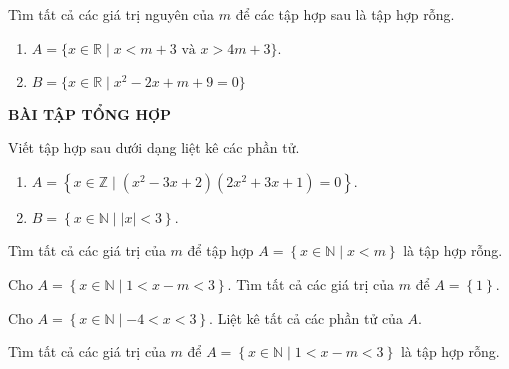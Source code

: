 \begin{bt}%
Tìm tất cả các giá trị nguyên của $m$ để các tập hợp sau là tập hợp rỗng.
\begin{enumerate}
	\item $A=\{x\in \mathbb{R} \mid x <m+3 \text{ và } x>4m+3 \}.$
	\item $B=\{x\in \mathbb{R} \mid x^2-2x+m+9=0\}$
\end{enumerate}
\end{bt}
\setcounter{bt}{0}

\begin{center}
\textbf{BÀI TẬP TỔNG HỢP}
\end{center}
\begin{bt}%
Viết tập hợp sau dưới dạng liệt kê các phần tử.
\begin{enumerate}
\item $A=\left\lbrace x\in \mathbb{Z}\mid (x^2-3x+2)(2x^2+3x+1)=0\right\rbrace$.
\item $B=\left\lbrace x\in \mathbb{N}\mid |x|<3\right\rbrace$.
\end{enumerate}
\end{bt}
\begin{bt}%
Tìm tất cả các giá trị của $m$ để tập hợp $A=\left\lbrace x\in \mathbb{N}\mid x<m\right\rbrace$ là tập hợp rỗng.
\end{bt}
\begin{bt}%
Cho $A=\left\lbrace x\in \mathbb{N}\mid 1<x-m<3 \right\rbrace$. Tìm tất cả các giá trị của $m$ để $A=\left\lbrace 1\right\rbrace$.
\end{bt}
\begin{bt}%
Cho $A=\left\lbrace x\in \mathbb{N}\mid -4<x<3\right\rbrace$. Liệt kê tất cả các phần tử của $A$.
\end{bt}
\begin{bt}%
Tìm tất cả các giá trị của $m$ để $A=\left\lbrace x\in \mathbb{N}\mid 1<x-m<3\right\rbrace$ là tập hợp rỗng.
\end{bt}

